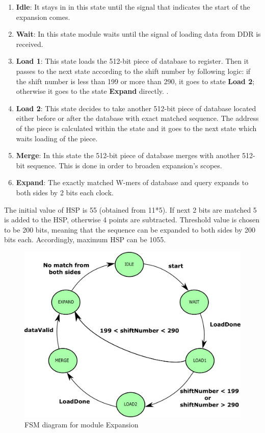 \begin{enumerate}
  \item \textbf{Idle}: It stays in in this state until the signal that indicates the start of the expansion comes.
  \item \textbf{Wait}: In this state module waits until the signal of loading data from DDR is received. 
  \item \textbf{Load 1}: This state loads the 512-bit piece of database to register. Then it passes to the next state according to the shift number by following logic: if the shift number is less than 199 or more than 290, it goes to state \textbf{Load 2}; otherwise it goes to the state \textbf{Expand} directly. . 
  \item \textbf{Load 2}: This state decides to take another 512-bit piece of database located either before or after the database with exact matched sequence. The address of the piece is calculated within the state and it goes to the next state which waits loading of the piece. 
  \item \textbf{Merge}: In this state the 512-bit piece of database merges with another 512-bit sequence. This is done in order to broaden expansion's scopes.
  \item \textbf{Expand}: The exactly matched W-mers of database and query expands to both sides by 2 bits each clock.
\end{enumerate}

The initial value of HSP is 55 (obtained from 11*5). If next 2 bits are matched 5 is added to the HSP, otherwise 4 points are subtracted. Threshold value is chosen to be 200 bits, meaning that the sequence can be expanded to both sides by 200 bits each. Accordingly, maximum HSP can be 1055. 
       

\begin{figure}[t!]
\centering
\includegraphics[width=\columnwidth]{Figures/expandFSM.pdf}
\caption{FSM diagram for module Expansion} \label{fig:expandFSM}
\end{figure}
       
